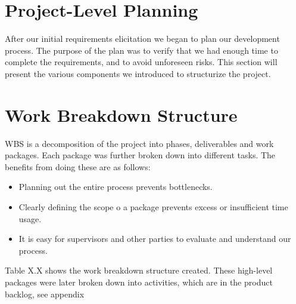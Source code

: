 \section{Project-Level Planning}
After our initial requirements elicitation we began to plan our
development process. The purpose of the plan was to verify that we had
enough time to complete the requirements, and to avoid unforeseen
risks. This section will present the various components we introduced
to structurize the project.

\section{Work Breakdown Structure}
WBS is a decomposition of the project into phases, deliverables and work
packages. Each package was further broken down into different tasks.
The benefits from doing these are as follows:
\begin{itemize}
    \item Planning out the entire process prevents bottlenecks.
    \item Clearly defining the scope o a package prevents excess or insufficient
        time usage. 
    \item It is easy for supervisors and other parties to evaluate and
        understand our process. 
\end{itemize}

Table X.X shows the work breakdown structure created. These high-level
packages were later broken down into activities, which are in the
product backlog, see appendix 

